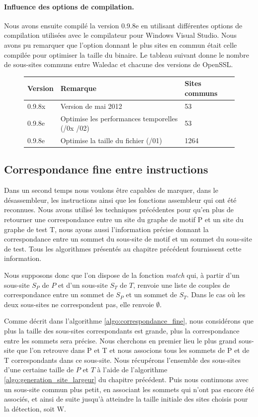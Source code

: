\paragraph{Influence des options de compilation.}
Nous avons ensuite compilé la version 0.9.8e en utilisant différentes options de compilation utilisées avec le compilateur pour Windows Visual Studio.
Nous avons pu remarquer que l'option donnant le plus sites en commun était celle compilée pour optimiser la taille du binaire. Le tableau suivant donne le nombre de sous-sites communs entre Waledac et chacune des versions de OpenSSL.

\begin{figure}[h]
\begin{tabular}{|l|l|l|}
 \hline
Version & Remarque & Sites communs \\
 \hline
0.9.8x & Version de mai 2012 & 53 \\
0.9.8e & Optimise les performances temporelles (/0x /02) & 53 \\
0.9.8e & Optimise la taille du fichier (/01) & 1264 \\
 \hline
\end{tabular}
\end{figure}

\subsection{Correspondance fine entre instructions}
Dans un second temps nous voulons être capables de marquer, dans le désassembleur, les instructions ainsi que les fonctions assembleur qui ont été reconnues.
Nous avons utilisé les techniques précédentes pour qu'en plus de retourner une correspondance entre un site du graphe de motif P et un site du graphe de test T, nous ayons aussi l'information précise donnant la correspondance entre un sommet du sous-site de motif et un sommet du sous-site de test. Tous les algorithmes présentés au chapitre précédent fournissent cette information.

Nous supposons donc que l'on dispose de la fonction \emph{match} qui, à partir d'un sous-site $S_P$ de $P$ et d'un sous-site $S_T$ de $T$, renvoie une liste de couples de correspondance entre un sommet de $S_P$ et un sommet de $S_T$. Dans le cas où les deux sous-sites ne correspondent pas, elle renvoie $\emptyset$.

Comme décrit dans l'algorithme \ref{algo:correspondance_fine}, nous considérons que plus la taille des sous-sites correspondants est grande, plus la correspondance entre les sommets sera précise.
Nous cherchons en premier lieu le plus grand sous-site que l'on retrouve dans P et T et nous associons tous les sommets de P et de T  correspondants dans ce sous-site. Nous récupérons l'ensemble des sous-sites d'une certaine taille de $P$ et $T$ à l'aide de l'algorithme \ref{algo:generation_site_largeur} du chapitre précédent.
Puis nous continuons avec un sous-site commun plus petit, en associant les sommets qui n'ont pas encore été associés, et ainsi de suite jusqu'à atteindre la taille initiale des sites choisis pour la détection, soit W. 

